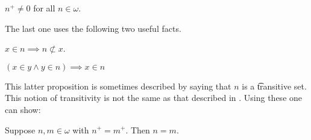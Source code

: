 \begin{proposition}
  $n^+ \neq 0$ for all $n \in \omega$.
\end{proposition}

The last one uses the following two useful facts.

\begin{proposition}
  $x \in n \implies n \not\subset x$.
\end{proposition}
\begin{proposition}
  $(x \in y \land y \in n) \implies x \in n$
\end{proposition}
This latter proposition is sometimes described by saying that $n$ is a \t{transitive set}.
This notion of transitivity is not the same as that described in .
Using these one can show:

\begin{proposition}
  Suppose $n, m \in \omega$ with $n^+ = m^+$.
  Then $n = m$.
\end{proposition}
